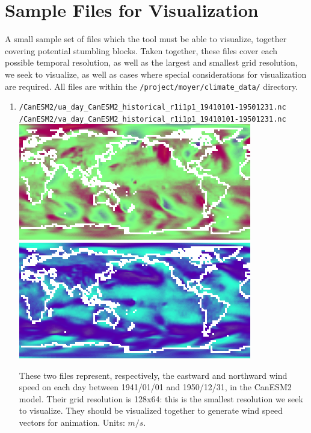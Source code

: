 \documentclass{article}
\begin{document}
\section{Sample Files for Visualization}
A small sample set of files which the tool must be able to visualize, together covering potential stumbling blocks. Taken together, these files cover each possible temporal resolution, as well as the largest and smallest grid resolution, we seek to visualize, as well as cases where special considerations for visualization are required. All files are within the \texttt{/project/moyer/climate\_data/} directory.

\begin{enumerate}
    \item \texttt{/CanESM2/ua\_day\_CanESM2\_historical\_r1i1p1\_19410101-19501231.nc} \\
          \texttt{/CanESM2/va\_day\_CanESM2\_historical\_r1i1p1\_19410101-19501231.nc} \\
          \includegraphics[scale = 0.4]{va}
          \includegraphics[scale = 0.4]{ua}
          
          These two files represent, respectively, the eastward and northward wind speed on each day between 1941/01/01 and 1950/12/31, in the CanESM2 model. Their grid resolution is 128x64: this is the smallest resolution we seek to visualize. They should be visualized together to generate wind speed vectors for animation. Units: $m/s$.
          

\end{enumerate}
\end{document}

